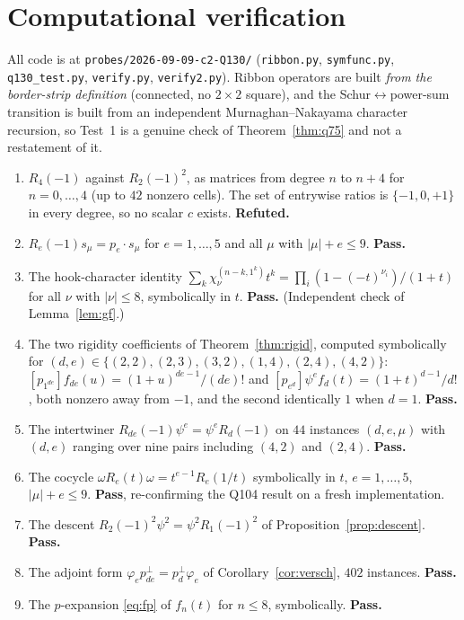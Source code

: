 \documentclass[11pt]{article}
\theoremstyle{definition}
\begin{document}
\section{Computational verification}\label{sec:verify}

All code is at \texttt{probes/2026-09-09-c2-Q130/} (\texttt{ribbon.py}, \texttt{symfunc.py},
\texttt{q130\_test.py}, \texttt{verify.py}, \texttt{verify2.py}).  Ribbon operators are built
\emph{from the border-strip definition} (connected, no $2\times2$ square), and the
Schur$\leftrightarrow$power-sum transition is built from an independent Murnaghan--Nakayama
character recursion, so Test~1 is a genuine check of Theorem~\ref{thm:q75} and not a
restatement of it.

\begin{enumerate}
\item[\textbf{Test 0}] $R_4(-1)$ against $R_2(-1)^{2}$, as matrices from degree $n$ to $n+4$
for $n=0,\dots,4$ (up to $42$ nonzero cells).  The set of entrywise ratios is $\{-1,0,+1\}$
in every degree, so no scalar $c$ exists.  \textbf{Refuted.}
\item[\textbf{Test 1}] $R_e(-1)s_\mu=p_e\cdot s_\mu$ for $e=1,\dots,5$ and all $\mu$ with
$|\mu|+e\le9$.  \textbf{Pass.}
\item[\textbf{Test 2}] The hook-character identity
$\sum_k\chi^{(n-k,1^{k})}_{\nu}t^{k}=\prod_i(1-(-t)^{\nu_i})/(1+t)$ for all $\nu$ with
$|\nu|\le8$, symbolically in $t$.  \textbf{Pass.}  (Independent check of Lemma~\ref{lem:gf}.)
\item[\textbf{Test 3}] The two rigidity coefficients of Theorem~\ref{thm:rigid}, computed
symbolically for $(d,e)\in\{(2,2),(2,3),(3,2),(1,4),(2,4),(4,2)\}$:
$[p_{1^{de}}]f_{de}(u)=(1+u)^{de-1}/(de)!$ and
$[p_{e^{d}}]\psi^{e}f_d(t)=(1+t)^{d-1}/d!$, both nonzero away from $-1$, and the second
identically $1$ when $d=1$.  \textbf{Pass.}
\item[\textbf{Test 4}] The intertwiner $R_{de}(-1)\psi^{e}=\psi^{e}R_d(-1)$ on $44$
instances $(d,e,\mu)$ with $(d,e)$ ranging over nine pairs including $(4,2)$ and $(2,4)$.
\textbf{Pass.}
\item[\textbf{Test 5}] The cocycle $\omega R_e(t)\omega=t^{e-1}R_e(1/t)$ symbolically in $t$,
$e=1,\dots,5$, $|\mu|+e\le9$.  \textbf{Pass}, re-confirming the Q104 result on a fresh
implementation.
\item[\textbf{Test 6}] The descent $R_2(-1)^{2}\psi^{2}=\psi^{2}R_1(-1)^{2}$ of
Proposition~\ref{prop:descent}.  \textbf{Pass.}
\item[\textbf{Test 7}] The adjoint form $\varphi_e p_{de}^{\perp}=p_d^{\perp}\varphi_e$ of
Corollary~\ref{cor:versch}, $402$ instances.  \textbf{Pass.}
\item[\textbf{Test 8}] The $p$-expansion \eqref{eq:fp} of $f_n(t)$ for $n\le8$, symbolically.
\textbf{Pass.}
\end{enumerate}
\end{document}
